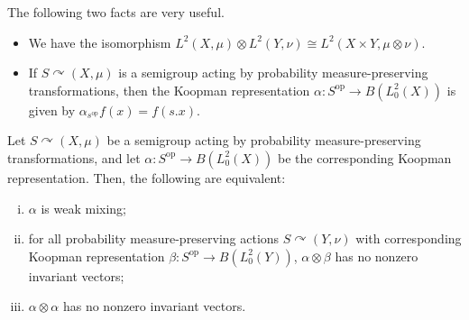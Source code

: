 \documentclass[10pt]{mypackage}
\begin{document}
The following two facts are very useful.
\begin{itemize}
  \item We have the isomorphism $L^2\left( X,\mu \right)\otimes L^2\left( Y,\nu \right)\cong L^2\left( X\times Y,\mu\otimes \nu \right)$.
  \item If $S\curvearrowright \left( X,\mu \right)$ is a semigroup acting by probability measure-preserving transformations, then the Koopman representation $\alpha\colon S^{\operatorname{op}}\rightarrow B\left( L^2_0\left( X \right) \right)$ is given by $\alpha_{s^{\operatorname{op}}} f(x) = f(s.x)$.
\end{itemize}
\begin{proposition}
  Let $S\curvearrowright \left( X,\mu \right)$ be a semigroup acting by probability measure-preserving transformations, and let $\alpha\colon S^{\operatorname{op}}\rightarrow B\left( L^2_0\left( X \right) \right)$ be the corresponding Koopman representation. Then, the following are equivalent:
  \begin{enumerate}[(i)]
    \item $\alpha$ is weak mixing;
    \item for all probability measure-preserving actions $S\curvearrowright \left( Y,\nu \right)$ with corresponding Koopman representation $\beta\colon S^{\operatorname{op}}\to B\left( L^2_0\left( Y \right) \right)$, $\alpha\otimes \beta$ has no nonzero invariant vectors;
    \item $\alpha\otimes\alpha$ has no nonzero invariant vectors.
  \end{enumerate}
\end{proposition}
\end{document}
